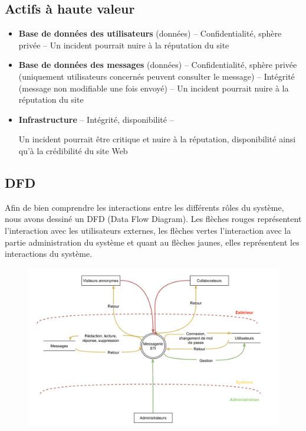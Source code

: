 \documentclass[a4paper,10pt]{article}
\begin{document}
    \subsection*{Actifs à haute valeur}
    \begin{onehalfspacing}
    \begin{itemize}
    \item \textbf{Base de données des utilisateurs} (données)
    \subitem-- Confidentialité, sphère privée
    \subitem-- Un incident pourrait nuire à la réputation du site
    \item \textbf{Base de données des messages} (données)
    \subitem-- Confidentialité, sphère privée (uniquement utilisateurs concernés peuvent consulter le message)
    \subitem-- Intégrité (message non modifiable une fois envoyé)
    \subitem-- Un incident pourrait nuire à la réputation du site
    \item \textbf{Infrastructure}
    \subitem-- Intégrité, disponibilité
    \subitem-- \parbox[t]{\linewidth}{Un incident pourrait être critique et nuire à la réputation, disponibilité ainsi qu’à la crédibilité du site Web}
    \end{itemize}
    \end{onehalfspacing}
    \subsection*{DFD}
    Afin de bien comprendre les interactions entre les différents rôles du système, nous avons dessiné un DFD (Data Flow Diagram). Les flèches rouges représentent l’interaction avec les utilisateurs externes, les flèches vertes l’interaction avec la partie administration du système et quant au flèches jaunes, elles représentent les interactions du système.
    \begin{figure}[H]
    \includegraphics[scale=0.3]{DFD.png}
    \centering
    \end{figure}
\end{document}
